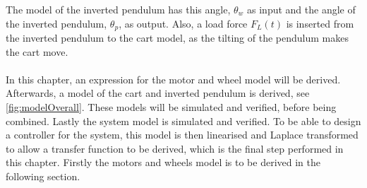 The model of the inverted pendulum has this angle, $\theta_w$ as input and the angle of the inverted pendulum, $\theta_p$, as output. Also, a load force $F_L(t)$ is inserted from the inverted pendulum to the cart model, as the tilting of the pendulum makes the cart move. %
\\\\
In this chapter, an expression for the motor and wheel model will be derived. Afterwards, a model of the cart and inverted pendulum is derived, see \autoref{fig:modelOverall}. These models will be simulated and verified, before being combined. Lastly the system model is simulated and verified. To be able to design a controller for the system, this model is then linearised and Laplace transformed to allow a transfer function to be derived, which is the final step performed in this chapter. %
Firstly the motors and wheels model is to be derived in the following section. 
%

